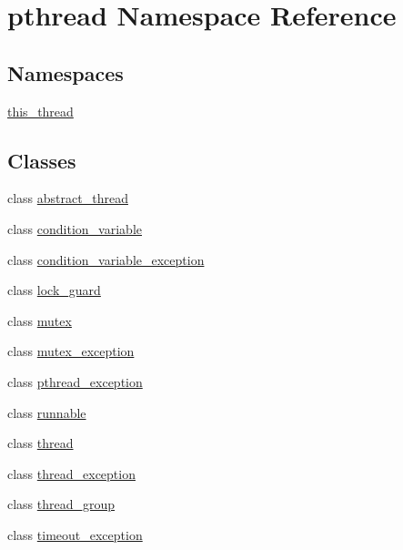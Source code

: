 \hypertarget{namespacepthread}{}\section{pthread Namespace Reference}
\label{namespacepthread}
\subsection*{Namespaces}
\begin{DoxyCompactItemize}
\item 
 \hyperlink{namespacepthread_1_1this__thread}{this\+\_\+thread}
\end{DoxyCompactItemize}
\subsection*{Classes}
\begin{DoxyCompactItemize}
\item 
class \hyperlink{classpthread_1_1abstract__thread}{abstract\+\_\+thread}
\item 
class \hyperlink{classpthread_1_1condition__variable}{condition\+\_\+variable}
\item 
class \hyperlink{classpthread_1_1condition__variable__exception}{condition\+\_\+variable\+\_\+exception}
\item 
class \hyperlink{classpthread_1_1lock__guard}{lock\+\_\+guard}
\item 
class \hyperlink{classpthread_1_1mutex}{mutex}
\item 
class \hyperlink{classpthread_1_1mutex__exception}{mutex\+\_\+exception}
\item 
class \hyperlink{classpthread_1_1pthread__exception}{pthread\+\_\+exception}
\item 
class \hyperlink{classpthread_1_1runnable}{runnable}
\item 
class \hyperlink{classpthread_1_1thread}{thread}
\item 
class \hyperlink{classpthread_1_1thread__exception}{thread\+\_\+exception}
\item 
class \hyperlink{classpthread_1_1thread__group}{thread\+\_\+group}
\item 
class \hyperlink{classpthread_1_1timeout__exception}{timeout\+\_\+exception}
\end{DoxyCompactItemize}
